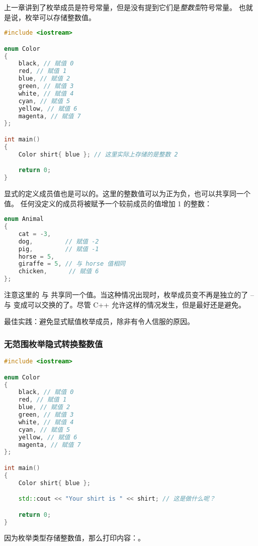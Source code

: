 \documentclass[../../LearnCpp.tex]{subfiles}
\begin{document}

上一章讲到了枚举成员是符号常量，但是没有提到它们是\textit{整数型}符号常量。
也就是说，枚举可以存储整数值。

\begin{lstlisting}[language=C++]
#include <iostream>

enum Color
{
    black, // 赋值 0
    red, // 赋值 1
    blue, // 赋值 2
    green, // 赋值 3
    white, // 赋值 4
    cyan, // 赋值 5
    yellow, // 赋值 6
    magenta, // 赋值 7
};

int main()
{
    Color shirt{ blue }; // 这里实际上存储的是整数 2

    return 0;
}
\end{lstlisting}

显式的定义成员值也是可以的。这里的整数值可以为正为负，也可以共享同一个值。
任何没定义的成员将被赋予一个较前成员的值增加 1 的整数：

\begin{lstlisting}[language=C++]
enum Animal
{
    cat = -3,
    dog,         // 赋值 -2
    pig,         // 赋值 -1
    horse = 5,
    giraffe = 5, // 与 horse 值相同
    chicken,      // 赋值 6
};
\end{lstlisting}

注意这里的  与  共享同一个值。当这种情况出现时，枚举成员变不再是独立的了 --  与  变成可以交换的了。尽管 C++ 允许这样的情况发生，但是最好还是避免。

最佳实践：避免显式赋值枚举成员，除非有令人信服的原因。

\subsubsection*{无范围枚举隐式转换整数值}

\begin{lstlisting}[language=C++]
#include <iostream>

enum Color
{
    black, // 赋值 0
    red, // 赋值 1
    blue, // 赋值 2
    green, // 赋值 3
    white, // 赋值 4
    cyan, // 赋值 5
    yellow, // 赋值 6
    magenta, // 赋值 7
};

int main()
{
    Color shirt{ blue };

    std::cout << "Your shirt is " << shirt; // 这是做什么呢？

    return 0;
}
\end{lstlisting}

因为枚举类型存储整数值，那么打印内容：。
\end{document}
